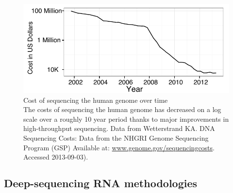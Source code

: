 \begin{figure}[htbp]
	\centering 
	\includegraphics{Figures/Sequencing_costs_over_time.pdf}
	\caption[Cost of sequencing the human genome over time]
	{
		Cost of sequencing the human genome over time\\[0.25cm]
		The costs of sequencing the human genome has decreased on a log scale over a roughly 10 year period thanks 
		to major improvements in high-throughput sequencing. Data from Wetterstrand KA. DNA Sequencing Costs: 
		Data from the NHGRI Genome Sequencing Program (GSP) Available at: \url{www.genome.gov/sequencingcosts}. Accessed 2013-09-03).
	}
	\label{fig:SeqCosts}
\end{figure}

\subsection{Deep-sequencing RNA methodologies}




